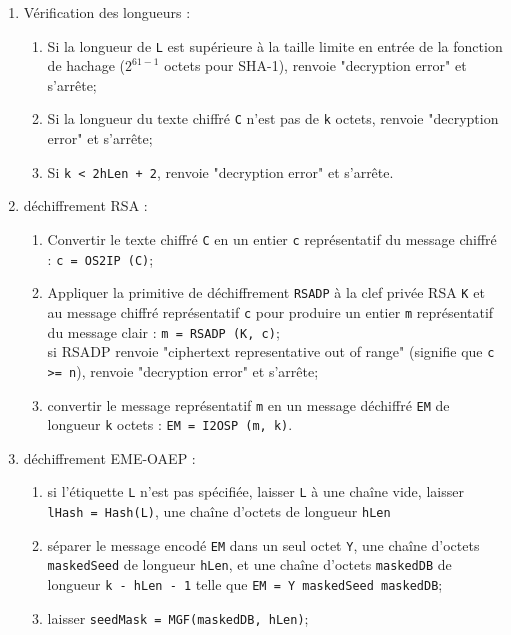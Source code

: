 \begin{enumerate}
\item Vérification des longueurs :
\begin{enumerate}
      \item Si la longueur de \texttt{L} est supérieure à la taille limite en entrée de la fonction de hachage (\texttt{$2^{61 - 1}$} octets pour SHA-1), renvoie "decryption error" et s'arrête;
\item Si la longueur du texte chiffré \texttt{C} n'est pas de \texttt{k} octets, renvoie "decryption error" et s'arrête;
     \item Si \texttt{k < 2hLen + 2}, renvoie "decryption error" et s'arrête.\\
\end{enumerate}
\item déchiffrement RSA :
\begin{enumerate}
      \item Convertir le texte chiffré \texttt{C} en un entier \texttt{c} représentatif du message chiffré : \texttt{c = OS2IP (C)};
      \item Appliquer la primitive de déchiffrement \texttt{RSADP} à la clef privée RSA \texttt{K} et au message chiffré représentatif \texttt{c} pour produire un entier \texttt{m} représentatif du message clair : \texttt{m = RSADP (K, c)};\\
       si RSADP renvoie "ciphertext representative out of range" (signifie que \texttt{c >= n}), renvoie "decryption error" et s'arrête;
       \item convertir le message représentatif \texttt{m} en un message déchiffré \texttt{EM} de longueur \texttt{k} octets : \texttt{EM = I2OSP (m, k)}.\\
\end{enumerate}
\item déchiffrement EME-OAEP :
\begin{enumerate}
      \item si l'étiquette \texttt{L} n'est pas spécifiée, laisser \texttt{L} à une chaîne vide, laisser \texttt{lHash = Hash(L)}, une chaîne d'octets de longueur \texttt{hLen}
       \item séparer le message encodé \texttt{EM} dans un seul octet \texttt{Y}, une chaîne d'octets \texttt{maskedSeed} de longueur \texttt{hLen}, et une chaîne d'octets \texttt{maskedDB} de longueur \texttt{k - hLen - 1} telle que \texttt{EM = Y \textbar\textbar maskedSeed \textbar\textbar maskedDB};
       \item laisser \texttt{seedMask = MGF(maskedDB, hLen)};

\end{enumerate}
\end{enumerate}
